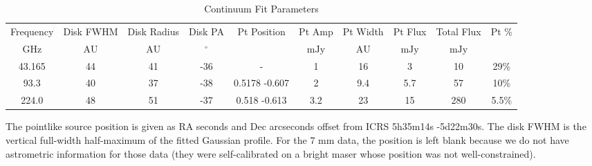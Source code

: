 \begin{table*}[htp]
\centering
\caption{Continuum Fit Parameters}
\begin{tabular}{cccccccccc}
\label{tab:continuum_fit_parameters}
Frequency & Disk FWHM & Disk Radius & Disk PA & Pt Position & Pt Amp & Pt Width & Pt Flux & Total Flux & Pt \% \\
$\mathrm{GHz}$ & $\mathrm{AU}$ & $\mathrm{AU}$ & $\mathrm{{}^{\circ}}$ &  & $\mathrm{mJy}$ & $\mathrm{AU}$ & $\mathrm{mJy}$ & $\mathrm{mJy}$ & $\mathrm{}$ \\
\hline
43.165 & 44 & 41 & -36 & - & 1 & 16 & 3 & 10 & 29\% \\
93.3 & 40 & 37 & -38 & 0.5178 -0.607 & 2 & 9.4 & 5.7 & 57 & 10\% \\
224.0 & 48 & 51 & -37 & 0.518 -0.613 & 3.2 & 23 & 15 & 280 & 5.5\% \\
\hline
\end{tabular}

\par The pointlike source position is given as RA seconds and Dec arcseconds offset from ICRS 5h35m14s -5d22m30s.   The disk FWHM is the vertical full-width half-maximum of the fitted Gaussian profile.  For the 7 mm data, the position is left blank because we do not have astrometric information for those data (they were self-calibrated on a bright maser whose position was not well-constrained).
\end{table*}
